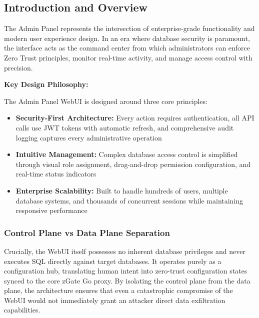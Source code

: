 \subsection{Introduction and Overview}

The Admin Panel represents the intersection of enterprise-grade functionality and modern user experience design. In an era where database security is paramount, the interface acts as the command center from which administrators can enforce Zero Trust principles, monitor real-time activity, and manage access control with precision.

\begin{mdframed}[backgroundcolor=blue!5, linecolor=blue!40, linewidth=2pt]
\textbf{Key Design Philosophy:}

The Admin Panel WebUI is designed around three core principles:
\begin{itemize}
    \item \textbf{Security-First Architecture:} Every action requires authentication, all API calls use JWT tokens with automatic refresh, and comprehensive audit logging captures every administrative operation
    \item \textbf{Intuitive Management:} Complex database access control is simplified through visual role assignment, drag-and-drop permission configuration, and real-time status indicators
    \item \textbf{Enterprise Scalability:} Built to handle hundreds of users, multiple database systems, and thousands of concurrent sessions while maintaining responsive performance
\end{itemize}
\end{mdframed}

\subsubsection{Control Plane vs Data Plane Separation}
Crucially, the WebUI itself possesses no inherent database privileges and never executes SQL directly against target databases. It operates purely as a configuration hub, translating human intent into zero-trust configuration states synced to the core zGate Go proxy. By isolating the control plane from the data plane, the architecture ensures that even a catastrophic compromise of the WebUI would not immediately grant an attacker direct data exfiltration capabilities.

